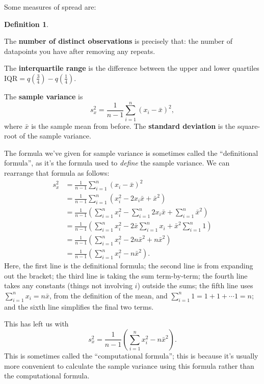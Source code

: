 \documentclass[
  a4paper,
]{book}
\theoremstyle{definition}
\newtheorem{definition}{Definition}[chapter]
\theoremstyle{definition}
\theoremstyle{definition}
\theoremstyle{remark}
\begin{document}
Some measures of spread are:

\begin{definition}
\protect\hypertarget{def:unlabeled-div-3}{}\label{def:unlabeled-div-3}

The \textbf{number of distinct observations} is precisely that: the number of datapoints you have after removing any repeats.

The \textbf{interquartile range} is the difference between the upper and lower quartiles \(\text{IQR} = q(\frac34) - q(\frac14)\).

The \textbf{sample variance} is
\[  s^2_x = \frac{1}{n-1} \sum_{i=1}^n (x_i - \bar x)^2 , \]
where \(\bar x\) is the sample mean from before. The \textbf{standard deviation} is the square-root of the sample variance.

\end{definition}

The formula we've given for sample variance is sometimes called the ``definitional formula'', as it's the formula used to \emph{define} the sample variance. We can rearrange that formula as follows:
\begin{align*}
  s^2_x &= \frac{1}{n-1} \sum_{i=1}^n (x_i - \bar x)^2 \\
      &= \frac{1}{n-1} \sum_{i=1}^n (x_i^2 - 2x_i\bar x + \bar x^2) \\
      &= \frac{1}{n-1}\left(\sum_{i=1}^nx_i^2 - \sum_{i=1}^n 2x_i\bar x + \sum_{i=1}^n\bar x^2 \right) \\
      &= \frac{1}{n-1} \left(\sum_{i=1}^n x_i^2 - 2\bar x \sum_{i=1}^n x_i + \bar x^2 \sum_{i=1}^n 1 \right) \\
      &= \frac{1}{n-1} \left(\sum_{i=1}^n x_i^2 - 2n\bar x^2 + n\bar x^2 \right) \\
      &= \frac{1}{n-1} \left(\sum_{i=1}^n x_i^2 -  n\bar x^2 \right) .
\end{align*}
Here, the first line is the definitional formula; the second line is from expanding out the bracket; the third line is taking the sum term-by-term; the fourth line takes any constants (things not involving \(i\)) outside the sums; the fifth line uses \(\sum_{i=1}^n x_i = n\bar x\), from the definition of the mean, and \(\sum_{i=1}^n 1 = 1 + 1 + \cdots 1 = n\); and the sixth line simplifies the final two terms.

This has left us with
\[ s^2_x = \frac{1}{n-1} \left(\sum_{i=1}^n x_i^2 -  n\bar x^2 \right) . \]
This is sometimes called the ``computational formula''; this is because it's usually more convenient to calculate the sample variance using this formula rather than the computational formula.
\end{document}
